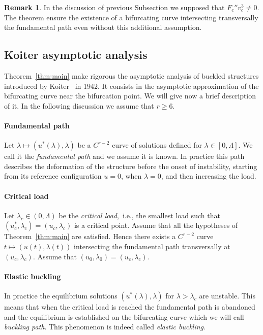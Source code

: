 \documentclass[a4paper,11pt]{article}
\theoremstyle{definition}
\newtheorem{rmk}[prop]{Remark}
\begin{document}
\begin{rmk}
In the discussion of previous Subsection we supposed that $F_c''v_c^3\neq0$. The theorem ensure the existence of a bifurcating curve intersecting transversally the fundamental path even without this additional assumption.
\end{rmk}

\subsection{Koiter asymptotic analysis}

Theorem~\ref{thm:main} make rigorous the asymptotic analysis of buckled structures introduced by Koiter~\cite{koiter} in 1942. It consists in the asymptotic approximation of the bifurcating curve near the bifurcation point. We will give now a brief description of it. In the following discussion we assume that $r\ge6$.

\paragraph{Fundamental path} Let $\lambda\mapsto(u^*(\lambda),\lambda)$ be a $C^{r-2}$ curve of solutions defined for $\lambda\in[0,\Lambda]$. We call it the \emph{fundamental path} and we assume it is known. In practice this path describes the deformation of the structure before the onset of instability, starting from its reference configuration $u=0$, when $\lambda=0$, and then increasing the load.

\paragraph{Critical load} Let $\lambda_c\in(0,\Lambda)$ be the \emph{critical load},~i.e., the smallest load such that $(u_c^*,\lambda_c)=(u_c,\lambda_c)$ is a critical point. Assume that all the hypotheses of Theorem~\ref{thm:main} are satisfied. Hence there exists a $C^{r-2}$ curve $t\mapsto(u(t),\lambda(t))$ intersecting the fundamental path transversally at $(u_c,\lambda_c)$. Assume that $(u_0,\lambda_0)=(u_c,\lambda_c)$.

\paragraph{Elastic buckling} In practice the equilibrium solutions $(u^*(\lambda),\lambda)$ for $\lambda>\lambda_c$ are unstable. This means that when the critical load is reached the fundamental path is abandoned and the equilibrium is established on the bifurcating curve which we will call \emph{buckling path}. This phenomenon is indeed called \emph{elastic buckling}.
\end{document}

